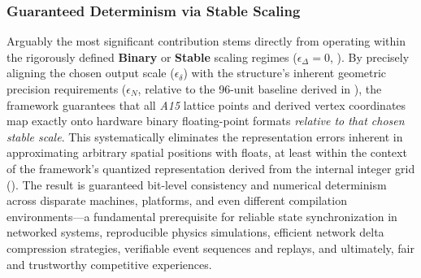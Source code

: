 \documentclass[10pt]{article}
\def\AAAB{\textit{A15}}
\begin{document}
\subsubsection{Guaranteed Determinism via Stable Scaling}\label{subsubsec:benefits-determinism}
Arguably the most significant contribution stems directly from operating within the rigorously defined \textbf{Binary} or \textbf{Stable} scaling regimes ($\epsilon_\Delta = 0$, ). By precisely aligning the chosen output scale ($\epsilon_\delta$) with the structure's inherent geometric precision requirements ($\epsilon_N$, relative to the 96-unit baseline derived in ), the framework guarantees that all \AAAB{} lattice points and derived vertex coordinates map exactly onto hardware binary floating-point formats \emph{relative to that chosen stable scale}. This systematically eliminates the representation errors inherent in approximating arbitrary spatial positions with floats, at least within the context of the framework's quantized representation derived from the internal integer grid (). The result is guaranteed bit-level consistency and numerical determinism across disparate machines, platforms, and even different compilation environments—a fundamental prerequisite for reliable state synchronization in networked systems, reproducible physics simulations, efficient network delta compression strategies, verifiable event sequences and replays, and ultimately, fair and trustworthy competitive experiences.
\end{document}
